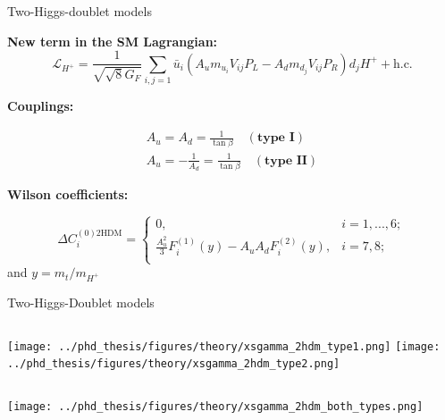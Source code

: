 \documentclass[xcolor=dvipsnames]{beamer}
\begin{document}
\begin{frame}{Two-Higgs-doublet models}

   \scriptsize

   \textbf{New term in the SM Lagrangian:}
   \begin{equation*}
      \mathcal{L}_{H^+} = \frac{1}{\sqrt{\sqrt8G_F}} \sum_{i,j=1} \bar{u}_i (A_u m_{u_i}V_{ij}P_L - A_d m_{d_j}V_{ij}P_R)d_jH^+ + \mathrm{h.c}.
  \end{equation*}

  \textbf{Couplings:}

\begin{align*}
A_u = A_d = \frac{1}{\tan\beta} \quad (\textbf{type I})\\
A_u = - \frac{1}{A_d} = \frac{1}{\tan\beta} \quad  (\textbf{type II})
\end{align*}

\textbf{Wilson coefficients:}

\begin{equation*}\label{eq:partial_wilson_2hdm}
   \Delta C_i^{(0)\text{2HDM}} = 
   \begin{cases}
       0, & i=1,...,6;\\
       \frac{A_u^2}{3}F_i^{(1)}(y) - A_uA_dF_i^{(2)}(y), & i=7,8;\\
   \end{cases}
\end{equation*}
and $y = m_t/m_{H^+}$
\end{frame}

\begin{frame}{Two-Higgs-Doublet models}
   \centering
\begin{columns}
   \texttt{[image: ../phd\_thesis/figures/theory/xsgamma\_2hdm\_type1.png]}
   \texttt{[image: ../phd\_thesis/figures/theory/xsgamma\_2hdm\_type2.png]}
\end{columns}

       \texttt{[image: ../phd\_thesis/figures/theory/xsgamma\_2hdm\_both\_types.png]}


  
\end{frame}
\end{document}
